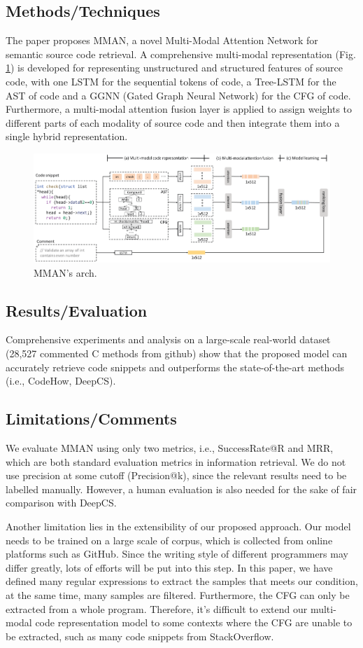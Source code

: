 \subsection{Methods/Techniques}
The paper proposes MMAN, a novel Multi-Modal Attention Network for semantic source code retrieval. A comprehensive multi-modal representation (Fig. \ref{fig:mman}) is developed for representing unstructured and structured features of source code, with one LSTM for the sequential tokens of code, a Tree-LSTM for the AST of code and a GGNN (Gated Graph Neural Network) for the CFG of code. Furthermore, a multi-modal attention fusion layer is applied to assign weights to different parts of each modality of source code and then integrate them into a single hybrid representation. 
\begin{figure}[h]
    \centering
    \includegraphics[width=\linewidth]{mman.png} %
    \caption{MMAN's arch.}	
    \label{fig:mman}
\end{figure}
\subsection{Results/Evaluation}
Comprehensive experiments and analysis on a large-scale real-world dataset (28,527 commented C methods from github) show that the proposed model can accurately retrieve code snippets and outperforms the state-of-the-art methods (i.e., CodeHow, DeepCS).
\subsection{Limitations/Comments}
We evaluate MMAN using only two metrics, i.e., SuccessRate@R and MRR, which are both standard evaluation metrics in information retrieval. We do not use precision at some cutoff (Precision@k), since the relevant results need to be labelled manually.  However, a human evaluation is also needed for the sake of fair comparison with DeepCS.

Another limitation lies in the extensibility of our proposed approach. Our model needs to be trained on a large scale of corpus, which is collected from online platforms such as GitHub. Since the writing style of different programmers may differ greatly, lots of efforts will be put into this step.  In this paper, we have defined many regular expressions to extract the samples that meets our condition, at the same time, many samples are filtered. Furthermore, the CFG can only be extracted from a whole program. Therefore, it’s difficult to extend our multi-modal code representation model to some contexts where the CFG are unable to be extracted, such as many code snippets from StackOverflow.

